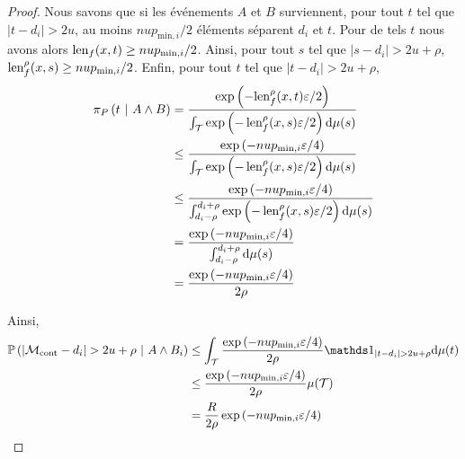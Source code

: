 \begin{proof}
    Nous savons que si les événements \(A\) et \(B\) surviennent, pour tout \(t\) tel que \(|t - d_i| > 2u\), au moins \(nup_{\text{min}, i}/2\) éléments séparent \(d_i\) et \(t\). Pour de tels \(t\) nous avons alors \(\operatorname{len}_f(x,t) \geq nup_{\text{min}, i}/2\). Ainsi, pour tout \(s\) tel que \(|s - d_i| > 2u + \rho\), \(\operatorname{len}_f^\rho(x,s) \geq nup_{\text{min}, i}/2\). Enfin, pour tout \(t\) tel que \(|t - d_i| > 2u + \rho\),
    \begin{align*}
        \pi_P\left( t\ |\ A \wedge B \right) & = \dfrac{\exp\left( -{\operatorname{len}_f^\rho(x,t)\varepsilon}/{2} \right)}{\int_\mathcal T \exp\left( {-\operatorname{len}_f^\rho(x,s)\varepsilon}/{2} \right)\mathrm{d} \mu(s)}\\
        & \leq \dfrac{\exp\left( -{nup_{\text{min}, i}\varepsilon}/{4} \right)}{\int_\mathcal T \exp\left( {-\operatorname{len}_f^\rho(x,s)\varepsilon}/{2} \right)\mathrm{d} \mu(s)}\\
        & \leq \dfrac{\exp\left( -{nup_{\text{min}, i}\varepsilon}/{4} \right)}{\int_{d_i-\rho}^{d_i+\rho} \exp\left( {-\operatorname{len}_f^\rho(x,s)\varepsilon}/{2} \right)\mathrm{d} \mu(s)}\\
        & = \dfrac{\exp\left( -{nup_{\text{min}, i}\varepsilon}/{4} \right)}{\int_{d_i-\rho}^{d_i+\rho}\mathrm{d} \mu(s)}\\
        & = \dfrac{\exp\left( -{nup_{\text{min}, i}\varepsilon}/{4} \right)}{2\rho}\\
    \end{align*}

    Ainsi,
    \begin{align*}
        \mathbb P\left( |\mathcal M_{\text{cont}} - d_i| > 2u + \rho \ | \ A \wedge B_i\right) & \leq \int_\mathcal T \dfrac{\exp\left( -{nup_{\text{min}, i}\varepsilon}/{4} \right)}{2\rho}\un_{| t - d_i| > 2u + \rho} \dt\mu(t)\\
        & \leq \dfrac{\exp\left( -{nup_{\text{min}, i}\varepsilon}/{4} \right)}{2\rho} \mu(\mathcal T)\\
        & = \dfrac{R}{2\rho}\exp\left( -{nup_{\text{min}, i}\varepsilon}/{4} \right)
    \end{align*}


\end{proof}
